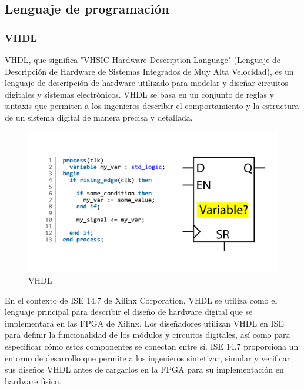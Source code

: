 \documentclass[osajnl,twocolumn,showpacs,superscriptaddress,10pt]{revtex4-1}
\begin{document}
\subsection{Lenguaje de programación}

\subsubsection{VHDL}

VHDL, que significa "VHSIC Hardware Description Language" (Lenguaje de Descripción de Hardware de Sistemas Integrados de Muy Alta Velocidad), es un lenguaje de descripción de hardware utilizado para modelar y diseñar circuitos digitales y sistemas electrónicos. VHDL se basa en un conjunto de reglas y sintaxis que permiten a los ingenieros describir el comportamiento y la estructura de un sistema digital de manera precisa y detallada.

\begin{figure}[H]
    \begin{center}
        \includegraphics[scale=0.12]{images/variables-as-registers.png}
        \caption{VHDL}
        \label{Amplificador Operacional}
    \end{center}
\end{figure}


En el contexto de ISE 14.7 de Xilinx Corporation, VHDL se utiliza como el lenguaje principal para describir el diseño de hardware digital que se implementará en las FPGA de Xilinx. Los diseñadores utilizan VHDL en ISE para definir la funcionalidad de los módulos y circuitos digitales, así como para especificar cómo estos componentes se conectan entre sí. ISE 14.7 proporciona un entorno de desarrollo que permite a los ingenieros sintetizar, simular y verificar sus diseños VHDL antes de cargarlos en la FPGA para su implementación en hardware físico.
\end{document}

